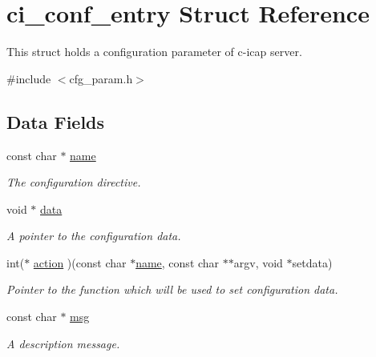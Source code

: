 \hypertarget{structci__conf__entry}{
\section{ci\_\-conf\_\-entry Struct Reference}
\label{structci__conf__entry}
}


This struct holds a configuration parameter of c-\/icap server.  


{\ttfamily \#include $<$cfg\_\-param.h$>$}\subsection*{Data Fields}
\begin{DoxyCompactItemize}
\item 
\hypertarget{structci__conf__entry_ab185fa1470fc9252b5cfc6babea58b73}{
const char $\ast$ \hyperlink{structci__conf__entry_ab185fa1470fc9252b5cfc6babea58b73}{name}}
\label{structci__conf__entry_ab185fa1470fc9252b5cfc6babea58b73}

\begin{DoxyCompactList}\small\item\em The configuration directive. \item\end{DoxyCompactList}\item 
\hypertarget{structci__conf__entry_a6767ed6ae2ffa7475959456953f0f5b5}{
void $\ast$ \hyperlink{structci__conf__entry_a6767ed6ae2ffa7475959456953f0f5b5}{data}}
\label{structci__conf__entry_a6767ed6ae2ffa7475959456953f0f5b5}

\begin{DoxyCompactList}\small\item\em A pointer to the configuration data. \item\end{DoxyCompactList}\item 
int($\ast$ \hyperlink{structci__conf__entry_a590f0f7422f75f66b40a7e8155c3fd35}{action} )(const char $\ast$\hyperlink{structci__conf__entry_ab185fa1470fc9252b5cfc6babea58b73}{name}, const char $\ast$$\ast$argv, void $\ast$setdata)
\begin{DoxyCompactList}\small\item\em Pointer to the function which will be used to set configuration data. \item\end{DoxyCompactList}\item 
\hypertarget{structci__conf__entry_a41ecb36cd097e17fe2a14ca78338b83d}{
const char $\ast$ \hyperlink{structci__conf__entry_a41ecb36cd097e17fe2a14ca78338b83d}{msg}}
\label{structci__conf__entry_a41ecb36cd097e17fe2a14ca78338b83d}

\begin{DoxyCompactList}\small\item\em A description message. \item\end{DoxyCompactList}\end{DoxyCompactItemize}


